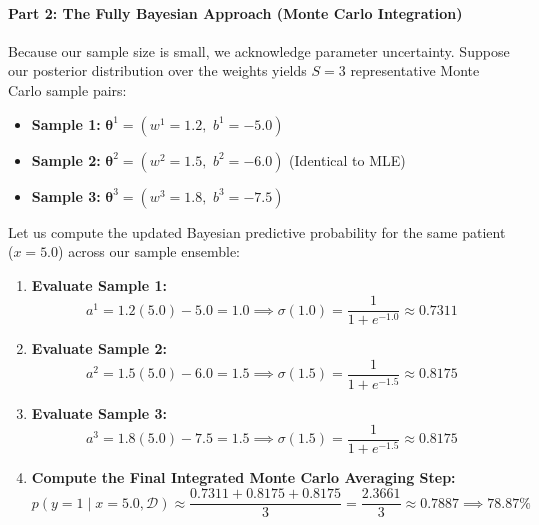 \documentclass{article}
\begin{document}
\paragraph{Part 2: The Fully Bayesian Approach (Monte Carlo Integration)}
Because our sample size is small, we acknowledge parameter uncertainty. Suppose our posterior distribution over the weights yields $S = 3$ representative Monte Carlo sample pairs:
\begin{itemize}
    \item \textbf{Sample 1:} $\boldsymbol{\theta}^1 = (w^1 = 1.2, \,\, b^1 = -5.0)$
    \item \textbf{Sample 2:} $\boldsymbol{\theta}^2 = (w^2 = 1.5, \,\, b^2 = -6.0)$ (Identical to MLE)
    \item \textbf{Sample 3:} $\boldsymbol{\theta}^3 = (w^3 = 1.8, \,\, b^3 = -7.5)$
\end{itemize}

Let us compute the updated Bayesian predictive probability for the same patient ($x = 5.0$) across our sample ensemble:

\begin{enumerate}
    \item \textbf{Evaluate Sample 1:}
    \begin{equation}
    a^1 = 1.2(5.0) - 5.0 = 1.0 \implies \sigma(1.0) = \frac{1}{1 + e^{-1.0}} \approx 0.7311
    \end{equation}
    
    \item \textbf{Evaluate Sample 2:}
    \begin{equation}
    a^2 = 1.5(5.0) - 6.0 = 1.5 \implies \sigma(1.5) = \frac{1}{1 + e^{-1.5}} \approx 0.8175
    \end{equation}
    
    \item \textbf{Evaluate Sample 3:}
    \begin{equation}
    a^3 = 1.8(5.0) - 7.5 = 1.5 \implies \sigma(1.5) = \frac{1}{1 + e^{-1.5}} \approx 0.8175
    \end{equation}
    
    \item \textbf{Compute the Final Integrated Monte Carlo Averaging Step:}
    \begin{equation}
    p(y = 1 \mid x=5.0, \mathcal{D}) \approx \frac{0.7311 + 0.8175 + 0.8175}{3} = \frac{2.3661}{3} \approx 0.7887 \implies 78.87\%
    \end{equation}
\end{enumerate}
\end{document}
